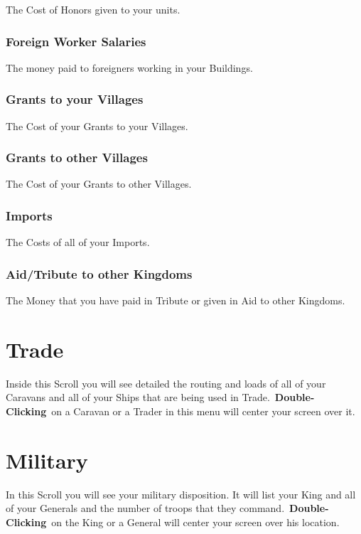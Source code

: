 The Cost of Honors given to your units.

\subsubsection{Foreign Worker Salaries}

The money paid to foreigners working in your Buildings.

\subsubsection{Grants to your Villages}

The Cost of your Grants to your Villages.

\subsubsection{Grants to other Villages}

The Cost of your Grants to other Villages.

\subsubsection{Imports}

The Costs of all of your Imports.

\subsubsection{Aid/Tribute to other Kingdoms}

The Money that you have paid in Tribute or given in Aid to other Kingdoms.

\section{Trade}

Inside this Scroll you will see detailed the routing and loads of all of your Caravans and all of your Ships that are being used in Trade. \textbf{Double-Clicking} on a Caravan or a Trader in this menu will center your screen over it.

\section{Military}

In this Scroll you will see your military disposition. It will list your King and all of your Generals and the number of troops that they command. \textbf{Double-Clicking} on the King or a General will center your screen over his location.

